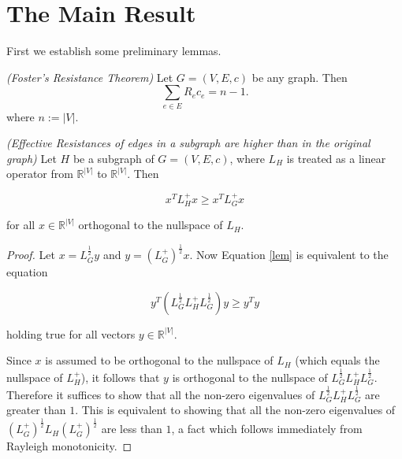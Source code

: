 \section{The Main Result}

First we establish some preliminary lemmas.
\begin{lemma} \label{foster}
\textit{(Foster's Resistance Theorem)} Let $G = (V, E, c)$ be any graph. Then 
\begin{equation}
\sum_{e \in E} R_ec_e = n-1.
\end{equation}
where $n:=|V|$. 
\end{lemma}

\begin{lemma} \label{monotone}
\textit{(Effective Resistances of edges in a subgraph are higher than in the original graph)} Let $H$ be a subgraph of $G = (V, E, c)$, where $L_H$ is treated as a linear operator from $\mathbb{R}^{|V|}$ to $\mathbb{R}^{|V|}$. Then

\begin{equation}\label{lem} 
x^T L_H^+ x \geq x^T L_G^+ x
\end{equation}

for all $x \in \mathbb{R}^{|V|}$ orthogonal to the nullspace of $L_H$. 

\end{lemma}

\begin{proof}
Let $x = L_G^{\frac{1}{2}}y$ and $y=(L_G^+)^\frac{1}{2}x$. Now Equation \ref{lem} is equivalent to the equation

\begin{equation}
y^T \left(L_G^\frac{1}{2} L_H^+ L_G^\frac{1}{2}\right) y \geq y^T y
\end{equation}

holding true for all vectors $y \in \mathbb{R}^{|V|}$.

Since $x$ is assumed to be orthogonal to the nullspace of $L_H$ (which equals the nullspace of $L_H^+$), it follows that $y$ is orthogonal to the nullspace of $L_G^\frac{1}{2} L_H^+ L_G^\frac{1}{2}$. Therefore it suffices to show that all the non-zero eigenvalues of $L_G^\frac{1}{2} L_H^+ L_G^\frac{1}{2}$ are greater than $1$. 
This is equivalent to showing that all the non-zero eigenvalues of $\left(L_G^+ \right)^\frac{1}{2} L_H \left(L_G^+ \right)^\frac{1}{2}$ are less than $1$, a fact which follows immediately from Rayleigh monotonicity.
\end{proof}

